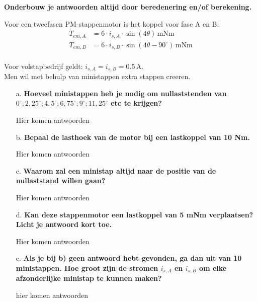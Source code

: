 \textbf{Onderbouw je antwoorden altijd door beredenering en/of berekening.}

Voor een tweefasen PM-stappenmotor is het koppel voor fase A en B:
\begin{align*}
    T_{em,A} &= 6 \cdot i_{s,A} \cdot \sin(4\theta) \, \text{mNm} \\
    T_{em,B} &= 6 \cdot i_{s,B} \cdot \sin(4\theta - 90^\circ) \, \text{mNm}
    \end{align*}\\
Voor volstapbedrijf geldt: \(i_{s,A} = i_{s,B} = 0.5 \, \text{A}\).\\
Men wil met behulp van ministappen extra stappen creeren.    


\begin{enumerate}
    \item [a.] \textbf{Hoeveel ministappen heb je nodig om nullaststenden van $0^\circ ; 2,25^\circ ; 4,5^\circ ; 6,75^\circ ; 9^\circ ; 11,25^\circ$ etc te krijgen?}
    
        Hier komen antwoorden

    \item [b.] \textbf{Bepaal de lasthoek van de motor bij een lastkoppel van 10 Nm.}
    
        Hier komen antwoorden

    \item [c.] \textbf{Waarom zal een ministap altijd naar de positie van de nullaststand willen
    gaan?}
    
        Hier komen antwoorden


    \item [d.] \textbf{Kan deze stappenmotor een lastkoppel van 5 mNm verplaatsen?
    Licht je antwoord kort toe.}     
    
        Hier komen antwoorden

    \item [e.] \textbf{Als je bij b) geen antwoord hebt gevonden, ga dan uit van 10 ministappen.
    Hoe groot zijn de stromen $i_{s,A}$ en $i_{s,B}$ om elke afzonderlijke ministap te kunnen
    maken?}
    
        hier komen antwoorden

\end{enumerate}